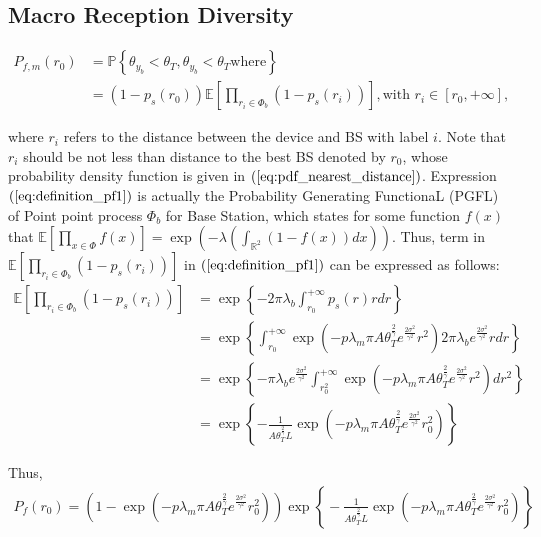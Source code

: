 \subsection{Macro Reception Diversity}
\begin{align}
\label{eq:definition_pf1} 
P_{f, m}(r_{0}) &= \mathbb{P}\left\lbrace  \theta_{y_b} < \theta_{T}, \theta_{y_b} < \theta_{T} \text{where} \right\rbrace \nonumber\\
&= ( 1-p_s( r_{0} ) ) \mathbb{E} \left[  \prod_{r_i \in \Phi_{b}} (1-p_{s}(r_i)) \right], \text{with } r_i \in \left[ r_{0}, +\infty\right],
\end{align} 

where $r_i$ refers to the distance between the device and BS with label $i$. Note that $r_i$ should be not less than distance to the best BS denoted by $r_{0}$, whose probability density function is given in $(\ref{eq:pdf_nearest_distance})$. Expression $(\ref{eq:definition_pf1})$ is actually the Probability Generating FunctionaL (PGFL) of Point point process $\Phi_{b}$ for Base Station, which states for some function $f(x)$ that $\mathbb{E}\left[ \prod_{x \in \Phi}f(x) \right] = \exp(-\lambda(\int_{\mathbb{R}^2}(1-f(x))dx))$. Thus, term in $\mathbb{E} \left[  \prod_{r_i \in \Phi_{b}} (1-p_{s}(r_i)) \right]$ in $(\ref{eq:definition_pf1})$ can be expressed as follows:
\begin{align}
\mathbb{E} \left[  \prod_{r_i \in \Phi_{b}} (1-p_{s}(r_i)) \right] &= \exp\left\lbrace -2\pi \lambda_{b} \int_{r_{0}}^{+\infty} p_{s}(r)rdr \right\rbrace \nonumber\\
&= \exp\left\lbrace  \int_{r_{0}}^{+\infty}  \exp(-p \lambda_{m} \pi A \theta_{T}^{\frac{2}{\gamma}} e^{\frac{2\sigma^2}{\gamma^2}}  r^2) 2 \pi \lambda_b e^{\frac{2\sigma^2}{\gamma^2}}  rdr  \right\rbrace \nonumber \\ 
&= \exp\left\lbrace -\pi \lambda_{b} e^{\frac{2\sigma^2}{\gamma^2}}  \int_{r_{0}^{2}}^{+\infty}  \exp(-p \lambda_{m} \pi A \theta_{T}^{\frac{2}{\gamma}} e^{\frac{2\sigma^2}{\gamma^2}}  r^2 ) dr^2  \right\rbrace \nonumber\\ 
&= \exp\left\lbrace -\frac{1}{ A \theta_{T}^{\frac{2}{\gamma}}  L }  \exp(-p \lambda_{m} \pi A \theta_{T}^{\frac{2}{\gamma}} e^{  \frac{2\sigma^2}{\gamma^2}  } r_{0}^2)  \right\rbrace
\end{align} 

Thus,
\begin{align}
P_{f}(r_{0}) = ( 1- \exp(-p \lambda_{m} \pi A \theta_{T}^{\frac{2}{\gamma}} e^{\frac{2\sigma^2}{\gamma^2}}  r_{0}^2 ) )\exp\left\lbrace \!\!\!-\frac{1}{ A \theta_{T}^{\frac{2}{\gamma}}  L }  \!\exp(-p \lambda_{m} \pi A \theta_{T}^{\frac{2}{\gamma}} e^{  \frac{2\sigma^2}{\gamma^2}  } r_{0}^2)  \!\!\!\right\rbrace
\end{align}


